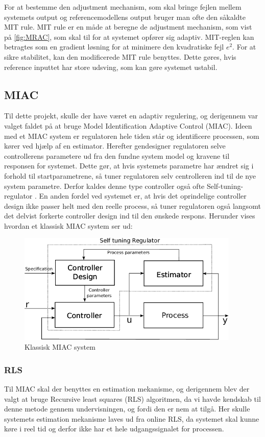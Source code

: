 For at bestemme den adjustment mechanism, som skal bringe fejlen mellem systemets output og referencemodellens output bruger man ofte den såkaldte MIT rule. MIT rule er en måde at beregne de adjustment mechanism, som vist på \autoref{fig:MRAC}, som skal til for at systemet opfører sig adaptiv. MIT-reglen kan betragtes som en gradient løsning for at minimere den kvadratiske fejl $e^{2}$. For at sikre stabilitet, kan den modificerede MIT rule benyttes. Dette gøres, hvis reference inputtet har store udsving, som kan gøre systemet ustabil. \\


\subsection{MIAC}
Til dette projekt, skulle der have været en adaptiv regulering, og derigennem var valget faldet på at bruge Model Identification Adaptive Control (MIAC). Ideen med et MIAC system er regulatoren hele tiden står og identificere processen, som kører ved hjælp af en estimator. Herefter gendesigner regulatoren selve controllerens parametere ud fra den fundne system model og kravene til responsen for systemet. Dette gør, at hvis systemets parametre har ændret sig i forhold til startparametrene, så tuner regulatoren selv centrolleren ind til de nye system parametre. Derfor kaldes denne type controller også ofte Self-tuning-regulator \cite{adaptive}. En anden fordel ved systemet er, at hvis det oprindelige controller design ikke passer helt med den reelle process, så tuner regulatoren også langsomt det delvist forkerte controller design ind til den ønskede respons. Herunder vises hvordan et klassisk MIAC system ser ud:

\begin{figure}[H]
	\centering
	\includegraphics[width = 300pt]{figur/MIAC}
	\caption{Klassisk MIAC system}
	\label{fig:MIAC}
\end{figure}

\subsubsection{RLS}
Til MIAC skal der benyttes en estimation mekanisme, og derigennem blev der valgt at bruge Recursive least squares (RLS) algoritmen, da vi havde kendskab til denne metode gennem undervisningen, og fordi den er nem at tilgå. Her skulle systemets estimation mekanisme laves ud fra online RLS, da systemet skal kunne køre i reel tid og derfor ikke har et hele udgangssignalet for processen. 

